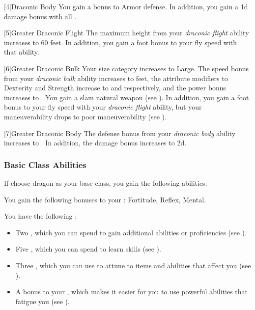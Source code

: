            [4]{Draconic Body} You gain a  bonus to Armor defense.
            In addition, you gain a \plus1d damage bonus with all .

            [5]{Greater Draconic Flight} The maximum height from your \textit{draconic flight} ability increases to 60 feet.
            In addition, you gain a  foot bonus to your fly speed with that ability.

            [6]{Greater Draconic Bulk} Your size category increases to Large.
            The speed bonus from your \textit{draconic bulk} ability increases to  feet, the attribute modifiers to Dexterity and Strength increase to  and  respectively, and the power bonus increases to .
            You gain a slam natural weapon (see ).
            In addition, you gain a  foot bonus to your fly speed with your \textit{draconic flight} ability, but your maneuverability drops to poor maneuverability (see ).

            [7]{Greater Draconic Body} The defense bonus from your \textit{draconic body} ability increases to .
            In addition, the damage bonus increases to \plus2d.

        \subsubsection{Basic Class Abilities}
            If choose dragon as your base class, you gain the following abilities.

            You gain the following bonuses to your :  Fortitude,  Reflex,  Mental.

             You have the following :
            \begin{itemize}
                \item Two , which you can spend to gain additional abilities or proficiencies (see ).
                \item Five , which you can spend to learn skills (see ).
                \item Three , which you can use to attune to items and abilities that affect you (see ).
                \item A  bonus to your , which makes it easier for you to use powerful abilities that fatigue you (see ).
            \end{itemize}

